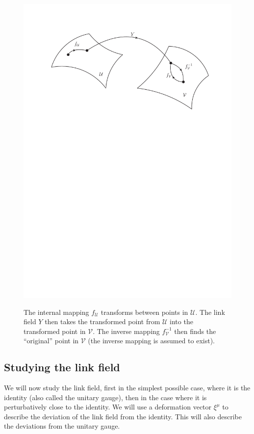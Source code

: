 \begin{figure}[!t]
      \begin{center}
{\includegraphics[scale=0.7]{images/mapping2}}
      \end{center}
\caption{The internal mapping $f_{\mathcal{U}}$ transforms between points in $\mathcal{U}$. The link field $Y$ then takes the transformed point from $\mathcal{U}$ into the transformed point in $\mathcal{V}$. The inverse mapping $f^{-1}_{\mathcal{V}}$ then finds the ``original'' point in $\mathcal{V}$ (the inverse mapping is assumed to exist).} \label{fig:mapping2}
\end{figure}

\subsection{Studying the link field}
We will now study the link field, first in the simplest possible case, where it is the identity (also called the unitary gauge), then in the case where it is perturbatively close to the identity. We will use a deformation vector $\xi^{\mu}$ to describe the deviation of the link field from the identity. This will also describe the deviations from the unitary gauge.

